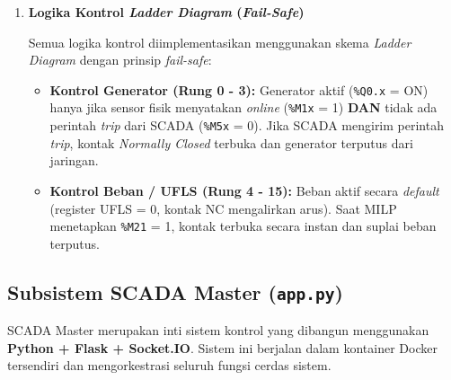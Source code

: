 \begin{enumerate}
\item[c.] \textbf{Logika Kontrol \textit{Ladder Diagram} (\textit{Fail-Safe})}

Semua logika kontrol diimplementasikan menggunakan skema \textit{Ladder Diagram} dengan prinsip \textit{fail-safe}:

\begin{itemize}
    \item[i.] \textbf{Kontrol Generator (Rung 0 - 3):}
    Generator aktif (\texttt{\%Q0.x} = ON) hanya jika sensor fisik menyatakan \textit{online} (\texttt{\%M1x} = 1) \textbf{DAN} tidak ada perintah \textit{trip} dari SCADA (\texttt{\%M5x} = 0). Jika SCADA mengirim perintah \textit{trip}, kontak \textit{Normally Closed} terbuka dan generator terputus dari jaringan.

    \item[ii.] \textbf{Kontrol Beban / UFLS (Rung 4 - 15):}
    Beban aktif secara \textit{default} (register UFLS = 0, kontak NC mengalirkan arus). Saat MILP menetapkan \texttt{\%M21} = 1, kontak terbuka secara instan dan suplai beban terputus.
\end{itemize}
\end{enumerate}

\subsection{Subsistem SCADA Master (\texttt{app.py})}
\label{subsec:SCADA_Master}

SCADA Master merupakan inti sistem kontrol yang dibangun menggunakan \textbf{Python + Flask + Socket.IO}.
Sistem ini berjalan dalam kontainer Docker tersendiri dan mengorkestrasi seluruh fungsi cerdas sistem.


